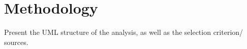 \section{Methodology}
\label{sec:methodology}

Present the UML structure of the analysis, as well as the selection criterion/ sources.